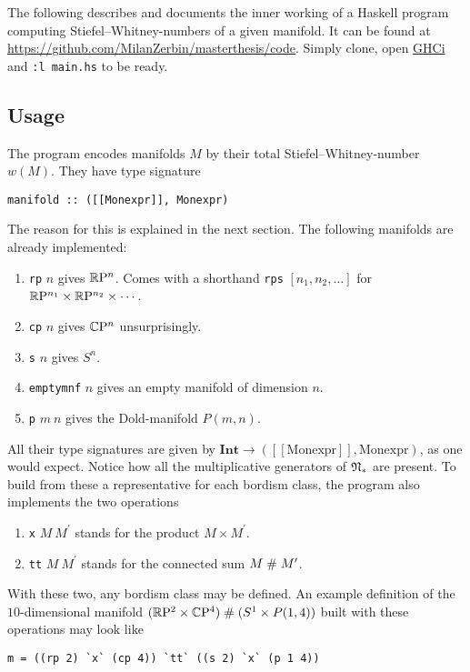 The following describes and documents the inner working of a Haskell program computing Stiefel--Whitney-numbers of a given manifold. 
It can be found at \url{https://github.com/MilanZerbin/masterthesis/code}. 
Simply clone, open \href{https://downloads.haskell.org/ghc/latest/docs/users_guide/}{GHCi} and \texttt{:l main.hs} to be ready.
\subsection*{Usage}
The program encodes manifolds $M$ by their total Stiefel--Whitney-number $w(M)$.
They have type signature 
\begin{lstlisting}
manifold :: ([[Monexpr]], Monexpr)
\end{lstlisting}
The reason for this is explained in the next section.
The following manifolds are already implemented:
\begin{enumerate}[noitemsep,label=$\rightarrow$]
    \item \texttt{rp} $n$ gives $\mathbb{R}\mathrm{P}^n$. Comes with a shorthand \texttt{rps} $[n_1,n_2,\dots]$ for $\mathbb{R}\mathrm{P}^{n_1}\times\mathbb{R}\mathrm{P}^{n_2}\times\cdots$.
    \item \texttt{cp} $n$ gives $\mathbb{C}\mathrm{P}^n$ unsurprisingly.
    \item \texttt{s} $n$ gives $S^n$.
    \item \texttt{emptymnf} $n$ gives an empty manifold of dimension $n$.
    \item \texttt{p} $m\: n$ gives the Dold-manifold $P(m,n)$.
\end{enumerate}
All their type signatures are given by $\textbf{Int} \to ([[\text{Monexpr}]],\text{Monexpr})$, as one would expect.
Notice how all the multiplicative generators of $\mathfrak{N}_\ast$ are present.
To build from these a representative for each bordism class, the program also implements the two operations
\begin{enumerate}[noitemsep,label=$\rightarrow$]
    \item \texttt{x} $M\: M^\prime$ stands for the product $M\times M^\prime$.
    \item \texttt{tt} $M\: M^\prime$ stands for the connected sum $M\mathrel\# M^\prime$.
\end{enumerate}
With these two, any bordism class may be defined. 
An example definition of the $10$-dimensional manifold $(\mathbb{R}\mathrm{P}^2\times\mathbb{C}\mathrm{P}^4)\mathrel\# (S^1 \times P(1,4))$ built with these operations may look like
\begin{lstlisting}
m = ((rp 2) `x` (cp 4)) `tt` ((s 2) `x` (p 1 4))
\end{lstlisting}
